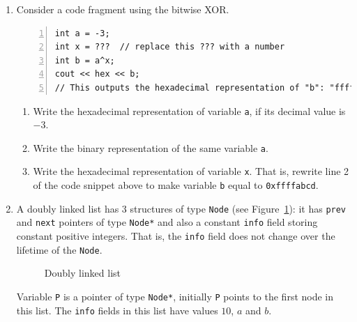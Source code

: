 \documentclass[a4paper,12pt]{article}
\begin{document}
\begin{enumerate}

\item 

Consider a code fragment using the bitwise XOR.

\begin{Verbatim}[frame=single,numbers=left]
int a = -3;
int x = ???  // replace this ??? with a number
int b = a^x;
cout << hex << b;
// This outputs the hexadecimal representation of "b": "ffffabcd".
\end{Verbatim}


\begin{enumerate}
\item Write the hexadecimal representation of variable \texttt{a}, if its decimal value is $-3$.
\item Write the binary representation of the same variable \texttt{a}.
\item Write the hexadecimal representation of variable \texttt{x}. That is, rewrite line 2 of the code snippet above to make variable \texttt{b} equal to {\tt 0xffffabcd}. 
\end{enumerate}

\vfill

\item 

A doubly linked list has 3 structures of type {\tt Node} (see Figure~\ref{fig:nodes}): 
it has {\tt prev} and {\tt next} pointers of type {\tt Node*} 
and also a constant {\tt info} field storing constant positive integers. That is, the {\tt info} field does not change over the lifetime of the \texttt{Node}. 

\begin{figure}[!htb]
\caption{\label{fig:nodes} Doubly linked list}
\end{figure}

Variable {\tt P} is a pointer of type {\tt Node*}, 
initially {\tt P} points to the first node in this list. 
The {\tt info} fields in this list have values $10$, $a$ and $b$. 


\end{enumerate}
\end{document}
